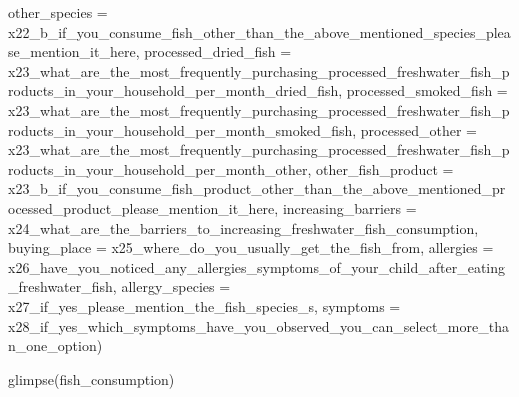 \documentclass[
]{article}
\newenvironment{Shaded}{\begin{snugshade}}{\end{snugshade}}
\newcommand{\AttributeTok}[1]{\textcolor[rgb]{0.77,0.63,0.00}{#1}}
\newcommand{\FunctionTok}[1]{\textcolor[rgb]{0.00,0.00,0.00}{#1}}
\newcommand{\NormalTok}[1]{#1}
\begin{document}
\begin{Shaded}
\begin{Highlighting}[]
       \AttributeTok{other\_species =}\NormalTok{ x22\_b\_if\_you\_consume\_fish\_other\_than\_the\_above\_mentioned\_species\_please\_mention\_it\_here,}
       \AttributeTok{processed\_dried\_fish =}\NormalTok{ x23\_what\_are\_the\_most\_frequently\_purchasing\_processed\_freshwater\_fish\_products\_in\_your\_household\_per\_month\_dried\_fish,}
       \AttributeTok{processed\_smoked\_fish =}\NormalTok{ x23\_what\_are\_the\_most\_frequently\_purchasing\_processed\_freshwater\_fish\_products\_in\_your\_household\_per\_month\_smoked\_fish,}
       \AttributeTok{processed\_other =}\NormalTok{ x23\_what\_are\_the\_most\_frequently\_purchasing\_processed\_freshwater\_fish\_products\_in\_your\_household\_per\_month\_other,}
       \AttributeTok{other\_fish\_product =}\NormalTok{ x23\_b\_if\_you\_consume\_fish\_product\_other\_than\_the\_above\_mentioned\_processed\_product\_please\_mention\_it\_here,}
       \AttributeTok{increasing\_barriers =}\NormalTok{ x24\_what\_are\_the\_barriers\_to\_increasing\_freshwater\_fish\_consumption,}
       \AttributeTok{buying\_place =}\NormalTok{ x25\_where\_do\_you\_usually\_get\_the\_fish\_from,}
       \AttributeTok{allergies =}\NormalTok{ x26\_have\_you\_noticed\_any\_allergies\_symptoms\_of\_your\_child\_after\_eating\_freshwater\_fish,}
       \AttributeTok{allergy\_species =}\NormalTok{ x27\_if\_yes\_please\_mention\_the\_fish\_species\_s,}
       \AttributeTok{symptoms =}\NormalTok{ x28\_if\_yes\_which\_symptoms\_have\_you\_observed\_you\_can\_select\_more\_than\_one\_option)}
      

\FunctionTok{glimpse}\NormalTok{(fish\_consumption)}
\end{Highlighting}
\end{Shaded}
\end{document}
